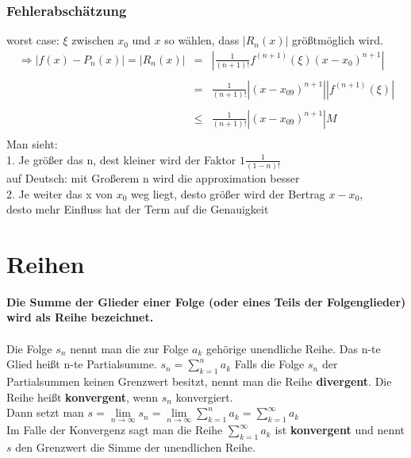 \documentclass[12pt,a4paper]{article}
\begin{document}
\subsubsection{Fehlerabschätzung}
worst case: $\xi$ zwischen $x_0$ und $x$ so wählen, dass $|R_n(x)|$ größtmöglich wird.\\
$$
\begin{matrix}
\Rightarrow\left|f(x)-P_n(x)\right|=\left|R_n(x)\right| &=& \left|\frac{1}{\left(n+1\right)!}f^{(n+1)}(\xi)\left(x-x_0\right)^{n+1}\right| \\
\\
&=& \frac{1}{\left(n+1\right)!}\left|\left(x-x_09\right)^{n+1}\right|\left|f^{(n+1)}(\xi)\right| \\
\\
&\leq& \frac{1}{\left(n+1\right)!}\left|\left(x-x_09\right)^{n+1}\right| M \\
\end{matrix}
$$
\newpage
Man sieht:\\
1. Je größer das n, dest kleiner wird der Faktor $1\frac{1}{(1-n)!}$\\
auf Deutsch: mit Großerem n wird die approximation besser\\
2. Je weiter das x von $x_0$ weg liegt, desto größer wird der Bertrag $x-x_0$, \\
desto mehr Einfluss hat der Term auf die Genauigkeit\\
\section{Reihen}
\textbf{Die Summe der Glieder einer Folge (oder eines Teils der Folgenglieder) wird als Reihe bezeichnet.}\\
\\
Die Folge $s_n$ nennt man die zur Folge $a_k$ gehörige unendliche
Reihe. Das n-te Glied heißt n-te Partialsumme.
$s_n=\sum\limits_{k=1}^{n}a_k$
Falls die Folge $s_n$ der Partialsummen keinen Grenzwert
besitzt, nennt man die Reihe \textbf{divergent}.
Die Reihe heißt \textbf{konvergent}, wenn $s_n$ konvergiert. 
\\Dann setzt man
$s=\lim\limits_{n\rightarrow \infty}s_n=\lim\limits_{n\rightarrow \infty}\sum\limits_{k=1}^{n}a_k=\sum\limits_{k=1}^{\infty}a_k$
\\Im Falle der Konvergenz sagt man die Reihe $\sum\limits_{k=1}^{\infty}a_k$ ist \textbf{konvergent} und nennt $s$ den Grenzwert die Simme der unendlichen Reihe. 
\end{document}

